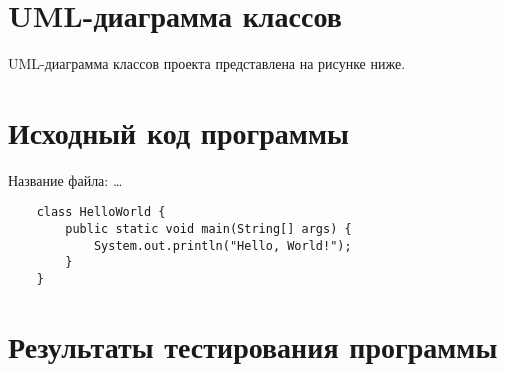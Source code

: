 \newcommand{\sectionset}{\centering\normalsize\normalfont\bfseries\expandafter\uppercase}
{}
\begin{appendices}
\renewcommand{\thesection}{\Asbuk{section}}

\newpage
\section{UML-диаграмма классов}\label{appendix:UML}

UML-диаграмма классов проекта представлена на рисунке ниже.

\newpage
\section{Исходный код программы}\label{appendix:code}
Название файла: \ldots

\begin{lstlisting}
	class HelloWorld {
		public static void main(String[] args) {
			System.out.println("Hello, World!"); 
		}
	}
\end{lstlisting}

\newpage
\section{Результаты тестирования программы}\label{appendix:test}


\end{appendices}
